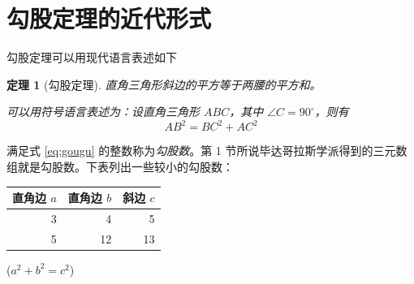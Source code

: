 \documentclass[UTF8]{ctexart}
\newtheorem{thm}{定理}
\begin{document}
\section{勾股定理的近代形式}
勾股定理可以用现代语言表述如下

\begin{thm}[勾股定理]
  直角三角形斜边的平方等于两腰的平方和。

  可以用符号语言表述为：设直角三角形 $ABC$，其中 $\angle C = 90^\circ$，则有
  \begin{equation}\label{eq:gougu}
    AB^2 = BC^2 + AC^2
  \end{equation}
\end{thm}

满足式 \eqref{eq:gougu} 的整数称为\emph{勾股数}。第 1 节所说毕达哥拉斯学派得到的三元数组就是勾股数。下表列出一些较小的勾股数：

\begin{table}[H]
  \begin{tabular}{|rrr|}
    \hline
    直角边 $a$ & 直角边 $b$ & 斜边 $c$ \\
    \hline
    3       & 4       & 5      \\
    5       & 12      & 13     \\
    \hline
  \end{tabular}%
  \qquad
  ($a^2 + b^2 = c^2$)
\end{table}


\end{document}
